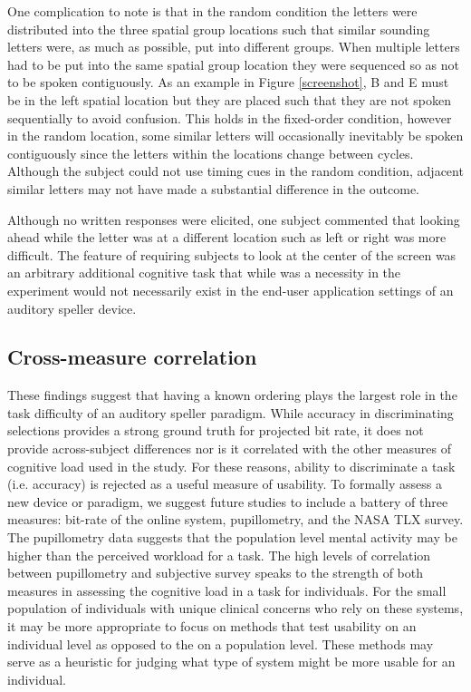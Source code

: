 \documentclass[10pt]{article}
\begin{document}
One complication to note is that in the random condition the
letters were distributed into the three spatial group
locations such that similar sounding letters were, as much as
possible, put into different groups. When multiple letters had
to be put into the same spatial group location they were
sequenced so as not to be spoken contiguously.  As an example
in Figure \ref{screenshot}, B and E must be in the left
spatial location but they are placed such that they are not
spoken sequentially to avoid confusion.  This holds in the
fixed-order condition, however in the random location, some
similar letters will occasionally inevitably be spoken contiguously since
the letters within the locations change between cycles.
Although the subject could not use timing cues in the
random condition, adjacent similar letters may not have made a substantial
difference in the outcome. 

Although no written responses were elicited, one subject
commented that looking ahead while the letter was at a
different location such as left or right was more difficult.
The feature of requiring subjects to look at the center of the
screen was an arbitrary additional cognitive task that while
was a necessity in the experiment would not necessarily exist
in the end-user application settings of an auditory speller
device.

\subsection{Cross-measure correlation}

These findings suggest that having a known ordering plays the
largest role in the task difficulty of an auditory speller
paradigm.  While accuracy in discriminating selections
provides a strong ground truth for projected bit rate, it does
not provide across-subject differences nor is it correlated
with the other measures of cognitive load used in the study.
For these reasons, ability to discriminate a task (i.e.
accuracy) is rejected as a useful measure of usability.  To
formally assess a new device or paradigm, we suggest future
studies to include a battery of three measures: bit-rate of
the online system, pupillometry, and the NASA TLX survey.
The pupillometry data suggests that the population level
mental activity may be higher than the perceived workload for
a task.  The high levels of correlation between pupillometry
and subjective survey speaks to the strength of both measures
in assessing the cognitive load in a task for individuals.
For the small population of individuals with unique clinical
concerns who rely on these systems, it may be more appropriate
to focus on methods that test usability on an individual level
as opposed to the on a population level.  These methods may
serve as a heuristic for judging what type of system might be
more usable for an individual.
\end{document}
